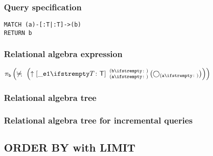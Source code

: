 \subsubsection*{Query specification}

\begin{lstlisting}
MATCH (a)-[:T|:T]->(b)
RETURN b
\end{lstlisting}

\subsubsection*{Relational algebra expression}

$\projection{\var{b}} \left(\alldifferent{} \left(\expandout{\_e1}{T}{a}{b}{} \left(\getvertices{a}{}\right)\right)\right)$

\subsubsection*{Relational algebra tree}


\subsubsection*{Relational algebra tree for incremental queries}


\subsection{ORDER BY with LIMIT}

